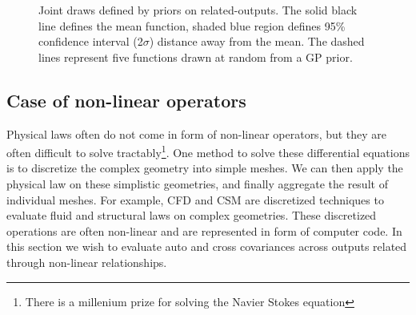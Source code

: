 \begin{figure}[!t]
  \centering
  \quad
  \caption{Joint draws defined by priors on related-outputs. The solid black line defines the mean function, shaded blue region defines 95\% confidence interval (2$\sigma$) distance away from the mean. The dashed lines represent five functions drawn at random from a GP prior.}
  \label{figJointRelationshipGPPriors}
\end{figure}

\subsection{Case of non-linear operators}
Physical laws often do not come in form of non-linear operators, but they are often difficult to solve tractably\footnote{There is a millenium prize for solving the Navier Stokes equation}. One method to solve these differential equations is to discretize the complex geometry into simple meshes. We can then apply the physical law on these simplistic geometries, and finally aggregate the result of individual meshes. For example, CFD and CSM are discretized techniques to evaluate fluid and structural laws on complex geometries. These discretized operations are often non-linear and are represented in form of computer code. In this section we wish to evaluate auto and cross covariances across outputs related through non-linear relationships.

